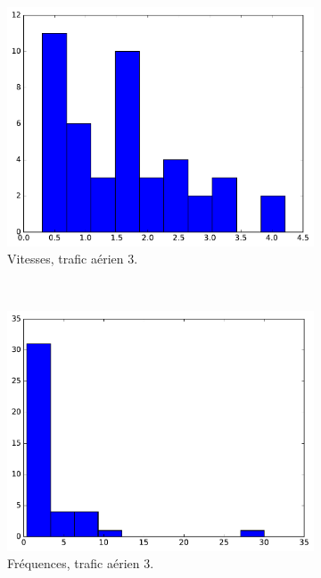 	\begin{figure}[!htbp]
		\begin{subfigure}[t]{\subImgWclicks}
			\centering
			\includegraphics[width=\textwidth]{figures/ch3/hkg_filteredSpeed}
			\caption{Vitesses, trafic aérien 3.}
			\label{fig:hkg_filteredSpeed}
		\end{subfigure}
		~
		\begin{subfigure}[t]{\subImgWclicks}
			\centering
			\includegraphics[width=\textwidth]{figures/ch3/hkg_frequency}
			\caption{Fréquences, trafic aérien 3.}
			\label{fig:hkg_frequency}
		\end{subfigure}
		~
		\begin{subfigure}[t]{\subImgWclicks}

\end{subfigure}
\end{figure}
